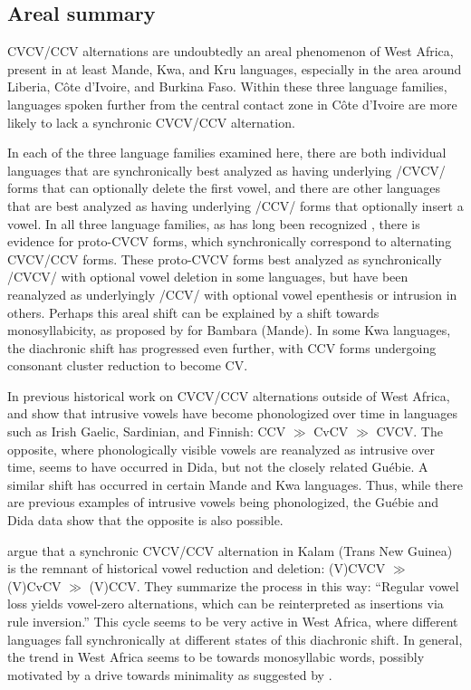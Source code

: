 \documentclass[output=paper,colorlinks,citecolor=brown]{langscibook}
\begin{document}
\subsection{Areal summary}
CVCV\slash CCV alternations are undoubtedly an areal phenomenon of West Africa, present in at least Mande, Kwa, and Kru languages, especially in the area around Liberia, Côte d'Ivoire, and Burkina Faso. Within these three language families, languages spoken further from the central contact zone in Côte d'Ivoire are more likely to lack a synchronic CVCV\slash CCV alternation.

In each of the three language families examined here, there are both individual languages that are synchronically best analyzed as having underlying /CVCV/ forms that can optionally delete the first vowel, and there are other languages that are best analyzed as having underlying /CCV/ forms that optionally insert a vowel. In all three language families, as has long been recognized \citep{Hyman:1972, LeSaout:1974, Leben:2002, Leben:2003, Vydrine:2010}, there is evidence for proto-CVCV forms, which synchronically correspond to alternating CVCV\slash CCV forms. These proto-CVCV forms best analyzed as synchronically /CVCV/ with optional vowel deletion in some languages, but have been reanalyzed as underlyingly /CCV/ with optional vowel epenthesis or intrusion in others. Perhaps this areal shift can be explained by a shift towards monosyllabicity, as proposed by \citet{Green:2010} for Bambara (Mande). In some Kwa languages, the diachronic shift has progressed even further, with CCV forms undergoing consonant cluster reduction to become CV.

In previous historical work on CVCV\slash CCV alternations outside of West Africa, \citet{Harms:1976} and \citet{Hall2006} show that intrusive vowels have become phonologized over time in languages such as Irish Gaelic, Sardinian, and Finnish: CCV $\gg$ CvCV $\gg$ CVCV. The opposite, where phonologically visible vowels are reanalyzed as intrusive over time, seems to have occurred in Dida, but not the closely related Guébie. A similar shift has occurred in certain Mande and Kwa languages. Thus, while there are previous examples of intrusive vowels being phonologized, the Guébie and Dida data show that the opposite is also possible.

\citet{Blevins&Pawley} argue that a synchronic CVCV\slash CCV alternation in Kalam (Trans New Guinea) is the remnant of historical vowel reduction and deletion: (V)CVCV $\gg$ (V)CvCV $\gg$ (V)CCV. They summarize the process in this way: ``Regular vowel loss yields vowel-zero alternations, which can be reinterpreted as insertions via rule inversion.'' This cycle seems to be very active in West Africa, where different languages fall synchronically at different states of this diachronic shift. In general, the trend in West Africa seems to be towards monosyllabic words, possibly motivated by a drive towards minimality as suggested by \citet{Green:2010, Green:2018}.
\end{document}
